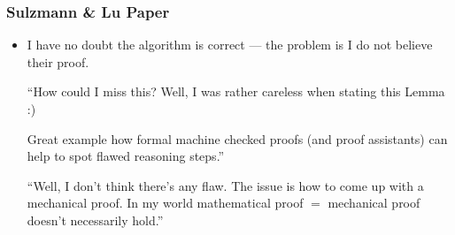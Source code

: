 \documentclass[dvipsnames,14pt,t]{beamer}
\begin{document}
\begin{frame}[t,squeeze]
\frametitle{Sulzmann \& Lu Paper}

\begin{itemize}
\item I have no doubt the algorithm is correct --- 
  the problem is I do not believe their proof.

  \begin{center}
  \begin{bubble}[10cm]\small
  ``How could I miss this? Well, I was rather careless when 
  stating this Lemma :)\smallskip
 
  Great example how formal machine checked proofs (and 
  proof assistants) can help to spot flawed reasoning steps.''
  \end{bubble}
  \end{center}\pause
  
  \begin{center}
  \begin{bubble}[10cm]\small
  ``Well, I don't think there's any flaw. The issue is how to 
  come up with a mechanical proof. In my world mathematical 
  proof $=$ mechanical proof doesn't necessarily hold.''
  \end{bubble}
  \end{center}\pause
  
\end{itemize}

  

\end{frame}
\end{document}
